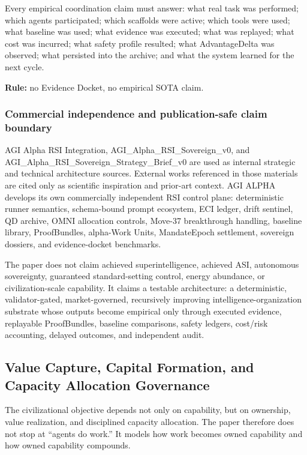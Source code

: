 Every empirical coordination claim must answer: what real task was
performed; which agents participated; which scaffolds were active; which
tools were used; what baseline was used; what evidence was executed;
what was replayed; what cost was incurred; what safety profile resulted;
what AdvantageDelta was observed; what persisted into the archive; and
what the system learned for the next cycle.

\textbf{Rule:} no Evidence Docket, no empirical SOTA claim.

\subsubsection{Commercial independence and publication-safe claim
boundary}\label{commercial-independence-and-publication-safe-claim-boundary}

AGI Alpha RSI Integration, AGI\_Alpha\_RSI\_Sovereign\_v0, and
AGI\_Alpha\_RSI\_Sovereign\_Strategy\_Brief\_v0 are used as internal
strategic and technical architecture sources. External works referenced
in those materials are cited only as scientific inspiration and
prior-art context. AGI ALPHA develops its own commercially independent
RSI control plane: deterministic runner semantics, schema-bound prompt
ecosystem, ECI ledger, drift sentinel, QD archive, OMNI allocation
controls, Move-37 breakthrough handling, baseline library, ProofBundles,
alpha-Work Units, MandateEpoch settlement, sovereign dossiers, and
evidence-docket benchmarks.

The paper does not claim achieved superintelligence, achieved ASI,
autonomous sovereignty, guaranteed standard-setting control, energy
abundance, or civilization-scale capability. It claims a testable
architecture: a deterministic, validator-gated, market-governed,
recursively improving intelligence-organization substrate whose outputs
become empirical only through executed evidence, replayable
ProofBundles, baseline comparisons, safety ledgers, cost/risk
accounting, delayed outcomes, and independent audit.

\subsection{Value Capture, Capital Formation, and Capacity Allocation
Governance}\label{value-capture-capital-formation-and-capacity-allocation-governance}

The civilizational objective depends not only on capability, but on
ownership, value realization, and disciplined capacity allocation. The
paper therefore does not stop at ``agents do work.'' It models how work
becomes owned capability and how owned capability compounds.

